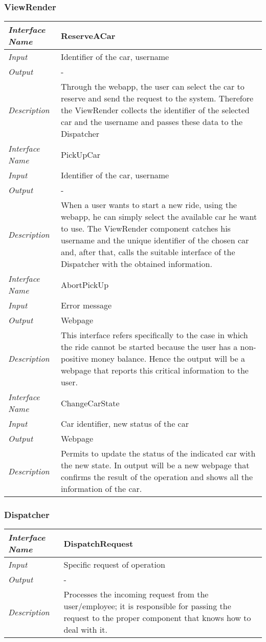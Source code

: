 \documentclass[11pt,a4paper]{report}
\begin{document}
\subsubsection{ViewRender}
\begin{tabularx}{\textwidth}{|>{\em}l|X|}
	\hline
	Interface Name& ReserveACar\\
	\hline
	Input & Identifier of the car, username\\
	\hline
	Output & -\\
	\hline
	Description &Through the webapp, the user can select the car to reserve and send the request to the system. Therefore the ViewRender collects the identifier of the selected car and the username and passes these data to the Dispatcher\\
	\hline\hline
	Interface Name& PickUpCar\\
	\hline
	Input & Identifier of the car, username\\
	\hline
	Output & -\\
	\hline
	Description &When a user wants to start a new ride, using the webapp, he can simply select the available car he want to use. The ViewRender component catches his username and the unique identifier of the chosen car and, after that, calls the suitable interface of the Dispatcher with the obtained information.\\
	\hline\hline
	Interface Name& AbortPickUp\\
	\hline
	Input & Error message\\
	\hline
	Output & Webpage\\
	\hline
	Description &This interface refers specifically to the case in which the ride cannot be started because the user has a non-positive money balance. Hence the output will be a webpage that reports this critical information to the user.\\
	\hline\hline
	Interface Name& ChangeCarState\\
	\hline
	Input & Car identifier, new status of the car\\
	\hline
	Output & Webpage\\
	\hline
	Description &Permits to update the status of the indicated car with the new state. In output will be a new webpage that confirms the result of the operation and shows all the information of the car.\\
	\hline
\end{tabularx}

\subsubsection{Dispatcher}
\begin{tabularx}{\textwidth}{|>{\em}l|X|}
	\hline
	Interface Name& DispatchRequest\\
	\hline
	Input & Specific request of operation\\
	\hline
	Output & -\\
	\hline
	Description &Processes the incoming request from the user/employee; it is responsible for passing the request to the proper component that knows how to deal with it.\\
	\hline
\end{tabularx}
\end{document}
